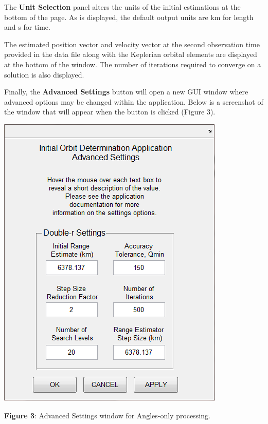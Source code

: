 \documentclass{article}
\begin{document}
				The \textbf{Unit Selection} panel alters the units of the initial estimations at the bottom of the page. As is displayed, the default output units are km for length and s for time. \par

				The estimated position vector and velocity vector at the second observation time provided in the data file along with the Keplerian orbital elements are displayed at the bottom of the  
                            		window. The number of iterations required to converge on a solution is also displayed.\par
		
			    	Finally, the \textbf{Advanced Settings} button will open a new GUI window where advanced options may be changed within the application. Below is a screenshot of the window that will appear when the button is clicked (Figure 3).

				\begin{center}
				\includegraphics{ApplicationAdvancedSettingsScreenshot.png}\par

				\small{\textbf{Figure 3}: Advanced Settings window for Angles-only processing.}\newline
				\end{center}			  
\end{document}
